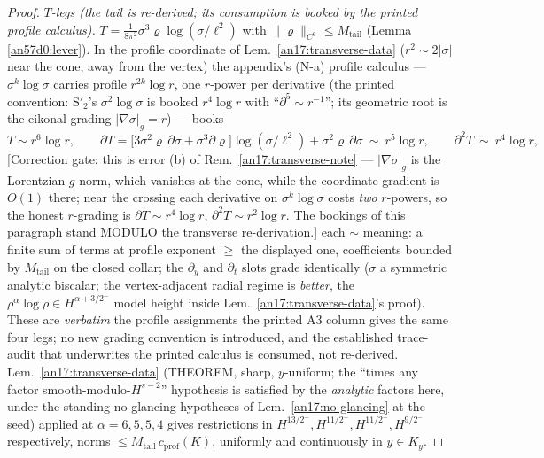 \begin{proof}
\emph{$T$-legs (the tail is re-derived; its consumption is booked by the
printed profile calculus).} $T=\frac1{8\pi^2}
\sigma^3\varrho\log(\sigma/\ell^2)$ with $\|\varrho\|_{C^6}\le
M_{\mathrm{tail}}$ (Lemma \ref{an57d0:lever}). In the profile coordinate of
Lem.\ \ref{an17:transverse-data} ($r^2\sim2|\sigma|$ near the cone, away from the
vertex) the appendix's (N-a) profile calculus --- $\sigma^k\log\sigma$
carries profile $r^{2k}\log r$, one $r$-power per derivative (the
printed convention: S$'_2$'s $\sigma^2\log\sigma$ is booked
$r^4\log r$ with ``$\partial^5\sim r^{-1}$''; its geometric
root is the eikonal grading $|\nabla\sigma|_g=r$) --- books
\[
 T\sim r^6\log r,\qquad
 \partial T=\bigl[3\sigma^2\varrho\,\partial\sigma
   +\sigma^3\partial\varrho\bigr]\log(\sigma/\ell^2)
   +\sigma^2\varrho\,\partial\sigma\ \sim\ r^5\log r,\qquad
 \partial^2T\ \sim\ r^4\log r,
\]
\textup{[Correction gate: this is error (b) of Rem.\ \ref{an17:transverse-note} ---
$|\nabla\sigma|_g$ is the Lorentzian $g$-norm, which vanishes at the cone,
while the coordinate gradient is $O(1)$ there; near the crossing each
derivative on $\sigma^k\log\sigma$ costs \emph{two} $r$-powers, so the honest
$r$-grading is $\partial T\sim r^4\log r$, $\partial^2T\sim r^2\log r$. The
bookings of this paragraph stand MODULO the transverse re-derivation.]}
each $\sim$ meaning: a finite sum of terms at profile exponent $\ge$ the
displayed one, coefficients bounded by $M_{\mathrm{tail}}$ on the closed
collar; the $\partial_y$ and $\partial_t$ slots grade identically ($\sigma$
a symmetric analytic biscalar; the vertex-adjacent radial regime is
\emph{better}, the $\rho^\alpha\log\rho\in H^{\alpha+3/2^-}$ model height
inside Lem.\ \ref{an17:transverse-data}'s proof). These are \emph{verbatim} the
profile assignments the printed A3 column gives the same four legs; no new
grading convention is introduced, and the established trace-audit that underwrites
the printed calculus is consumed, not re-derived. Lem.\
\ref{an17:transverse-data} (THEOREM, sharp, $y$-uniform; the ``times any factor
smooth-modulo-$H^{s-2}$'' hypothesis is satisfied by the \emph{analytic}
factors here, under the standing no-glancing hypotheses of Lem.\
\ref{an17:no-glancing} at the seed) applied at $\alpha=6,5,5,4$ gives restrictions
in $H^{13/2^-},H^{11/2^-},H^{11/2^-},H^{9/2^-}$ respectively, norms
$\le M_{\mathrm{tail}}\,c_{\mathrm{prof}}(K)$, uniformly and continuously
in $y\in K_y$.


\end{proof}
